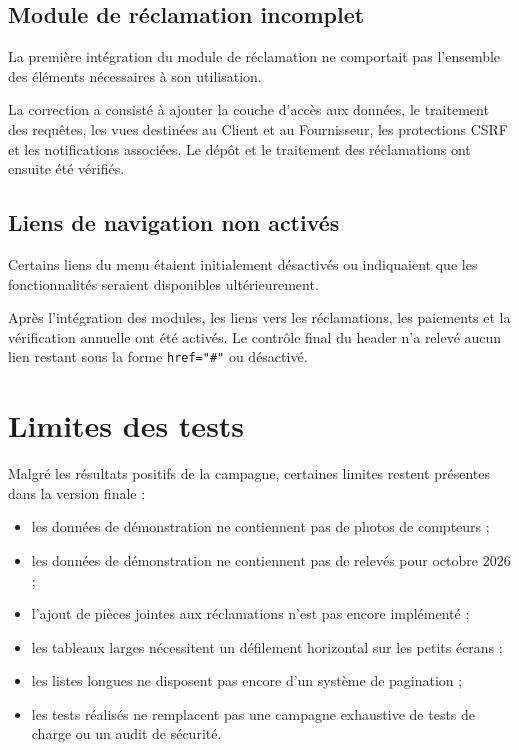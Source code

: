 \subsection{Module de réclamation incomplet}

La première intégration du module de réclamation ne comportait pas l'ensemble des éléments nécessaires à son utilisation.

La correction a consisté à ajouter la couche d'accès aux données, le traitement des requêtes, les vues destinées au Client et au Fournisseur, les protections CSRF et les notifications associées. Le dépôt et le traitement des réclamations ont ensuite été vérifiés.

\subsection{Liens de navigation non activés}

Certains liens du menu étaient initialement désactivés ou indiquaient que les fonctionnalités seraient disponibles ultérieurement.

Après l'intégration des modules, les liens vers les réclamations, les paiements et la vérification annuelle ont été activés. Le contrôle final du header n'a relevé aucun lien restant sous la forme \texttt{href="\#"} ou désactivé.

\section{Limites des tests}

Malgré les résultats positifs de la campagne, certaines limites restent présentes dans la version finale :
\begin{itemize}
    \item les données de démonstration ne contiennent pas de photos de compteurs ;
    \item les données de démonstration ne contiennent pas de relevés pour octobre 2026 ;
    \item l'ajout de pièces jointes aux réclamations n'est pas encore implémenté ;
    \item les tableaux larges nécessitent un défilement horizontal sur les petits écrans ;
    \item les listes longues ne disposent pas encore d'un système de pagination ;
    \item les tests réalisés ne remplacent pas une campagne exhaustive de tests de charge ou un audit de sécurité.
\end{itemize}

